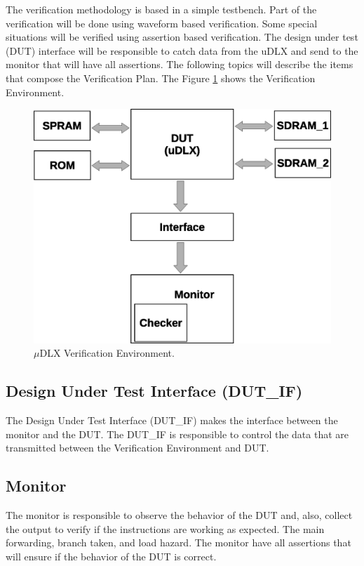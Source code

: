 \documentclass{article}
\begin{document}
	The verification methodology is based in a simple testbench. Part of the verification will be done using waveform based verification. Some special situations will be verified using assertion based verification. The design under test (DUT) interface will be responsible to catch data from the uDLX and send to the monitor that will have all assertions. The following topics will describe the items that compose the Verification Plan. The Figure \ref{fig:ver_env} shows the Verification Environment. 
	
		
	\begin{figure}[H]
    	\centering
    	\includegraphics[width=.7\linewidth]{pictures/verification_environment_v2.eps}
    	\caption{$\mu$DLX Verification Environment.}
    	\label{fig:ver_env}
  	\end{figure} 
	
	\subsection{Design Under Test Interface (DUT\_IF)}
	
	The Design Under Test Interface (DUT\_IF) makes the interface between the monitor and the DUT. The DUT\_IF is responsible to control the data that are transmitted between the Verification Environment and DUT.
	
	\subsection{Monitor}
	
	The monitor is responsible to observe the behavior of the DUT and, also, collect the output to verify if the instructions are working as expected. The main forwarding, branch taken, and load hazard.
The monitor have all assertions that will ensure if the behavior of the DUT is correct.
	
\end{document}
